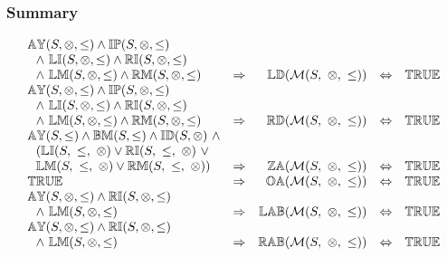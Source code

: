 \documentclass[../Summary.tex]{subfiles}
\begin{document}
\subsubsection{Summary}

\[
\begin{array}{lcrcl} 
\propname{AY}(S,\otimes,\leq) \wedge \propname{IP}(S,\otimes,\leq)  \\
\ \ \wedge \ \propname{LI}(S,\otimes,\leq) \wedge \propname{RI}(S,\otimes,\leq)  \\
\ \ \wedge \ \propname{LM}(S,\otimes,\leq) \wedge \propname{RM}(S,\otimes,\leq)
	& \Rightarrow
	& \propname{LD}(\mathcal{M}(S,\ \otimes,\ \leq)) 
    & \Leftrightarrow 
    & \propname{TRUE}
    \\ 
\propname{AY}(S,\otimes,\leq) \wedge \propname{IP}(S,\otimes,\leq)  \\
\ \ \wedge \ \propname{LI}(S,\otimes,\leq) \wedge \propname{RI}(S,\otimes,\leq)  \\
\ \ \wedge \ \propname{LM}(S,\otimes,\leq) \wedge \propname{RM}(S,\otimes,\leq)
	& \Rightarrow
	& \propname{RD}(\mathcal{M}(S,\ \otimes,\ \leq)) 
    & \Leftrightarrow 
    & \propname{TRUE}
    \\ 
\propname{AY}(S,\leq) \wedge \propname{BM}(S,\leq) \wedge \propname{ID}(S,\otimes) \ \wedge \\
\ \ (\propname{LI}(S,\ \leq,\ \otimes) \vee \propname{RI}(S,\ \leq,\ \otimes) \ \vee \\
\ \ \propname{LM}(S,\ \leq,\ \otimes) \vee \propname{RM}(S,\ \leq,\ \otimes))
	& \Rightarrow
	& \propname{ZA}(\mathcal{M}(S,\ \otimes,\ \leq)) 
    & \Leftrightarrow 
    & \propname{TRUE}
    \\
\propname{TRUE}
	& \Rightarrow
	& \propname{OA}(\mathcal{M}(S,\ \otimes,\ \leq)) 
    & \Leftrightarrow 
    & \propname{TRUE}
    \\  
\propname{AY}(S,\otimes,\leq) \wedge \propname{RI}(S,\otimes,\leq) \\ 
\ \ \wedge \ \propname{LM}(S,\otimes,\leq)
	& \Rightarrow
	& \propname{LAB}(\mathcal{M}(S,\ \otimes,\ \leq)) 
    & \Leftrightarrow 
    & \propname{TRUE}
    \\
\propname{AY}(S,\otimes,\leq) \wedge \propname{RI}(S,\otimes,\leq) \\ 
\ \ \wedge \ \propname{LM}(S,\otimes,\leq)
	& \Rightarrow
	& \propname{RAB}(\mathcal{M}(S,\ \otimes,\ \leq)) 
    & \Leftrightarrow 
    & \propname{TRUE}
    \\
\end{array} 
\] 
\end{document}
